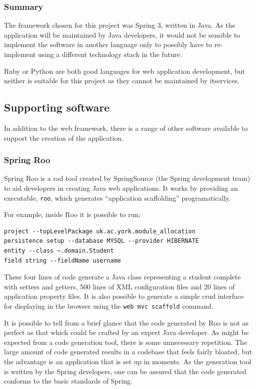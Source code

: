 \documentclass[draft]{scrartcl}
\begin{document}
\subsubsection{Summary}

The framework chosen for this project was Spring 3, written in Java. As the
application will be maintained by Java developers, it would not be sensible to
implement the software in another language only to possibly have to
re-implement using a different technology stack in the future.

Ruby or Python are both good languages for web application development, but
neither is suitable for this project as they cannot be maintained by
\gls{itservices}.

\subsection{Supporting software}

In addition to the web framework, there is a range of other software available
to support the creation of the application.

\subsubsection{Spring Roo}

Spring Roo is a \gls{rad} tool created by SpringSource (the Spring development team) to
aid developers in creating Java web applications. It works by providing an
executable, \texttt{roo}, which generates ``application scaffolding''
programatically.

For example, inside Roo it is possible to run:

\begin{lstlisting}
project --topLevelPackage uk.ac.york.module_allocation
persistence setup --database MYSQL --provider HIBERNATE
entity --class ~.domain.Student
field string --fieldName username
\end{lstlisting}

These four lines of code generate a Java class representing a student complete
with setters and getters, 500 lines of XML configuration files and 20 lines of
application property files. It is also possible to generate a simple
\gls{crud} interface for displaying in the browser using the \texttt{web mvc
scaffold} command.

It is possible to tell from a brief glance that the code generated by Roo is
not as perfect as that which could be crafted by an expert Java developer. As
might be expected from a code generation tool, there is some unnecessary
repetition. The large amount of code generated results in a codebase that
feels fairly bloated, but the advantage is an application that is set up in
moments. As the generation tool is written by the Spring developers, one can
be assured that the code generated conforms to the basic standards of Spring.
\end{document}
